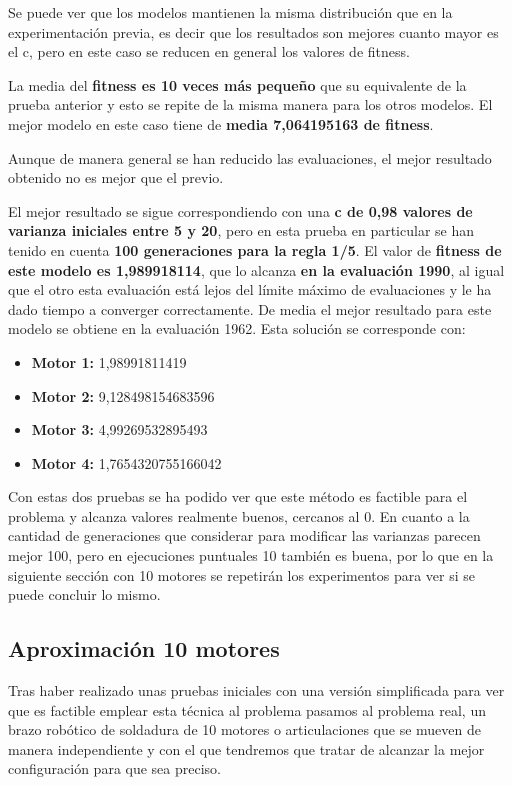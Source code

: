 \documentclass[12pt, spanish, pdftex]{UC3M_document}
\begin{document}
Se puede ver que los modelos mantienen la misma distribución que en la experimentación previa, es decir que los resultados son mejores cuanto mayor es el c, pero en este caso se reducen en general los valores de fitness.

La media del \textbf{fitness es 10 veces más pequeño} que su equivalente de la prueba anterior y esto se repite de la misma manera para los otros modelos. El mejor modelo en este caso tiene de \textbf{media 7,064195163 de fitness}.

Aunque de manera general se han reducido las evaluaciones, el mejor resultado obtenido no es mejor que el previo.

El mejor resultado se sigue correspondiendo con una \textbf{c de 0,98 valores de varianza iniciales entre 5 y 20}, pero en esta prueba en particular se han tenido en cuenta \textbf{100 generaciones para la regla 1/5}. El valor de \textbf{fitness de este modelo es 1,989918114}, que lo alcanza \textbf{en la evaluación 1990}, al igual que el otro esta evaluación está lejos del límite máximo de evaluaciones y le ha dado tiempo a converger correctamente. De media el mejor resultado para este modelo se obtiene en la evaluación 1962. Esta solución se corresponde con:
\begin{itemize}
	\item \textbf{Motor 1:} 1,98991811419
	\item \textbf{Motor 2:} 9,128498154683596 
	\item \textbf{Motor 3:} 4,99269532895493
	\item \textbf{Motor 4:} 1,7654320755166042
\end{itemize}
\pagebreak

Con estas dos pruebas se ha podido ver que este método es factible para el problema y alcanza valores realmente buenos, cercanos al 0. En cuanto a la cantidad de generaciones que considerar para modificar las varianzas parecen mejor 100, pero en ejecuciones puntuales 10 también es buena, por lo que en la siguiente sección con 10 motores se repetirán los experimentos para ver si se puede concluir lo mismo.

\subsection{Aproximación 10 motores}\label{sec:10m}
Tras haber realizado unas pruebas iniciales con una versión simplificada para ver que es factible emplear esta técnica al problema pasamos al problema real, un brazo robótico de soldadura de 10 motores o articulaciones que se mueven de manera independiente y con el que tendremos que tratar de alcanzar la mejor configuración para que sea preciso.
\end{document}
